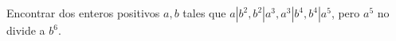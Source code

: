 Encontrar dos enteros positivos $a,b$ tales que $a | b^2, b^2 | a^3, a^3 | b^4, b^4 | a^5$, pero $a^5$ no divide a $b^6$.
